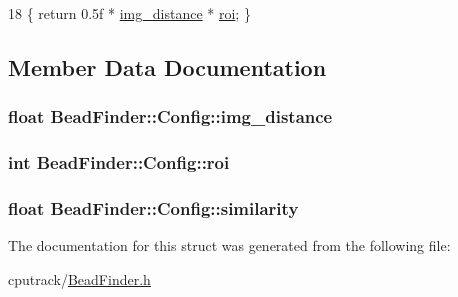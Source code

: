 \begin{DoxyCode}
18 \{ \textcolor{keywordflow}{return} 0.5f * \hyperlink{struct_bead_finder_1_1_config_ad00f5cda73407df2aafe3a15c528a771}{img\_distance} * \hyperlink{struct_bead_finder_1_1_config_afd0fcc1cea252dc5c64d98d3df23887e}{roi}; \}
\end{DoxyCode}


\subsection{Member Data Documentation}
\subsubsection[{\texorpdfstring{img\+\_\+distance}{img_distance}}]{\setlength{\rightskip}{0pt plus 5cm}float Bead\+Finder\+::\+Config\+::img\+\_\+distance}\hypertarget{struct_bead_finder_1_1_config_ad00f5cda73407df2aafe3a15c528a771}{}\label{struct_bead_finder_1_1_config_ad00f5cda73407df2aafe3a15c528a771}
\subsubsection[{\texorpdfstring{roi}{roi}}]{\setlength{\rightskip}{0pt plus 5cm}int Bead\+Finder\+::\+Config\+::roi}\hypertarget{struct_bead_finder_1_1_config_afd0fcc1cea252dc5c64d98d3df23887e}{}\label{struct_bead_finder_1_1_config_afd0fcc1cea252dc5c64d98d3df23887e}
\subsubsection[{\texorpdfstring{similarity}{similarity}}]{\setlength{\rightskip}{0pt plus 5cm}float Bead\+Finder\+::\+Config\+::similarity}\hypertarget{struct_bead_finder_1_1_config_ace5e499578ca57df89b304adab763a3e}{}\label{struct_bead_finder_1_1_config_ace5e499578ca57df89b304adab763a3e}


The documentation for this struct was generated from the following file\+:\begin{DoxyCompactItemize}
\item 
cputrack/\hyperlink{_bead_finder_8h}{Bead\+Finder.\+h}\end{DoxyCompactItemize}
